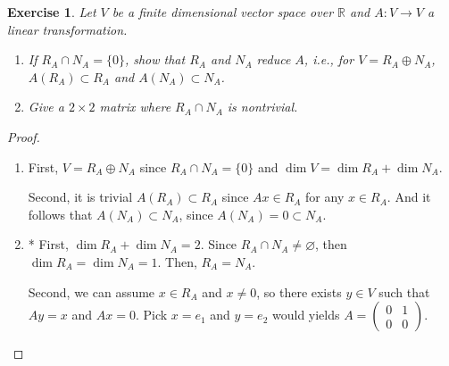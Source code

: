 \documentclass[11pt]{book}
\newtheorem{exercise}{Exercise}[section]
\theoremstyle{definition}
\numberwithin{equation}{chapter}
\begin{document}
\begin{exercise}
Let $V$ be a finite dimensional vector space over $\mathbb{R}$ and $A: V \to V$ a linear transformation.
\begin{enumerate}[label=(\alph*)]
    \item If $R_A \cap N_A = \{0\}$, show that $R_A$ and $N_A$ reduce $A$, i.e., for $V = R_A \oplus N_A$, $A(R_A) \subset R_A$ and $A(N_A) \subset N_A$.
    
    \item Give a $2 \times 2$ matrix where $R_A \cap N_A$ is nontrivial.
\end{enumerate}
\end{exercise}
\begin{proof}
~\begin{enumerate}[label=(\alph*)]
    \item First, $V = R_A \oplus N_A$ since $R_A \cap N_A = \{0\}$ and $\dim V = \dim R_A + \dim N_A$.
    
    Second, it is trivial $A(R_A) \subset R_A$ since $Ax \in R_A$ for any $x \in R_A$. And it follows that $A(N_A) \subset N_A$, since $A(N_A) = 0 \subset N_A$.
    
    \item* First, $\dim R_A + \dim N_A = 2$. Since $R_A \cap N_A \neq \varnothing$, then $\dim R_A = \dim N_A = 1$. Then, $R_A = N_A$.
    
    Second, we can assume $x \in R_A$ and $x \neq 0$, so there exists $y \in V$ such that $Ay = x$ and $Ax = 0$. Pick $x = e_1$ and $y = e_2$ would yields $A = \begin{pmatrix} 0 & 1 \\ 0 & 0 \end{pmatrix}$.
\end{enumerate}
\end{proof}

\medskip
\end{document}
